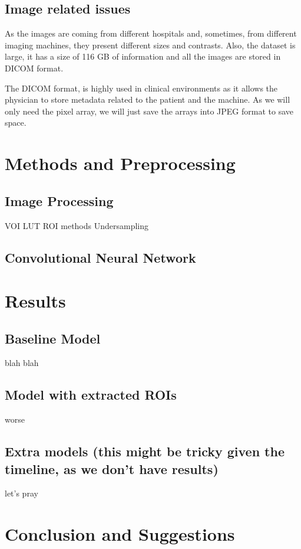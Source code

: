 \documentclass[conference]{IEEEtran}
\begin{document}
\subsection{Image related issues}

As the images are coming from different hospitals and, sometimes, from different imaging machines, they present different sizes and contrasts. Also, the dataset is large, it has a size of 116 GB of information and all the images are stored in DICOM format.  

The DICOM format, is highly used in clinical environments as it allows the physician to store metadata related to the patient and the machine. As we will only need the pixel array, we will just save the arrays into JPEG format to save space. 

\section{Methods and Preprocessing}

\subsection{Image Processing}

VOI LUT
ROI methods
Undersampling 
\subsection{Convolutional Neural Network}

\section{Results}
\subsection{Baseline Model}
blah blah
\subsection{Model with extracted ROIs}
worse 
\subsection{Extra models (this might be tricky given the timeline, as we don't have results)}
let's pray
\section{Conclusion and Suggestions}
\end{document}
